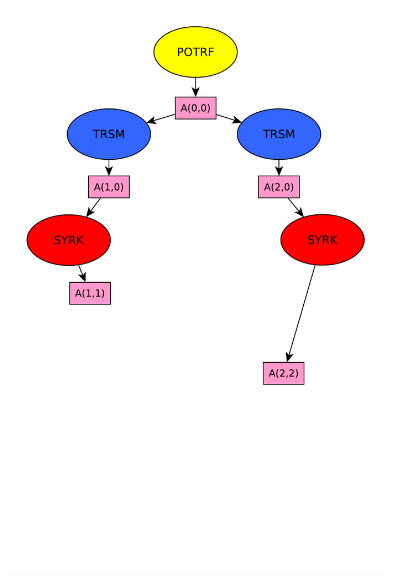 \documentclass[xcolor={usenames,dvipsnames,svgnames,table}, aspectratio=43]{beamer}
\begin{document}
\begin{frame}[fragile]
\begin{minipage}[t]{0.46\linewidth}
\begin{figure}
{    \includegraphics[width=0.9\textwidth]{graph/anim-dag/anim-3.pdf}%
  }%
\end{figure}
\end{minipage}
\end{frame}
\end{document}
